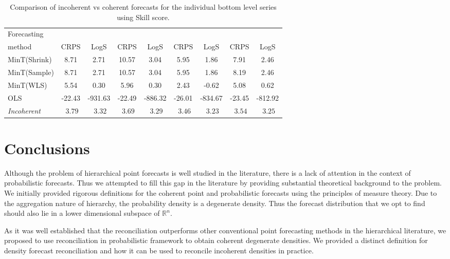 \documentclass[a4paper, 11pt]{article}
\def\mathbi#1{\textit{ #1}}
\begin{document}
\begin{table}
	\caption{Comparison of incoherent vs coherent forecasts for the individual bottom level series using Skill score.}\label{table:5}
	\centering\tabcolsep=0.08cm\small
	\begin{tabular}{@{}lSSSSSSSS@{}}
		\toprule
		Forecasting &
		 &
		 &
		 &
		 \\
		\cmidrule(lr){2-3} \cmidrule(lr){4-5} \cmidrule(lr){6-7} \cmidrule(l){8-9}
		method       & CRPS   & LogS    & CRPS   & LogS    & CRPS   & LogS    & CRPS   & LogS \\
		\midrule
		MinT(Shrink) & 8.71   & 2.71    & 10.57  & 3.04    & 5.95   & 1.86    & 7.91   & 2.46 \\
		MinT(Sample) & 8.71   & 2.71    & 10.57  & 3.04    & 5.95   & 1.86    & 8.19   & 2.46 \\
		MinT(WLS)    & 5.54   & 0.30    & 5.96   & 0.30    & 2.43   & -0.62   & 5.08   & 0.62 \\
		OLS          & -22.43 & -931.63 & -22.49 & -886.32 & -26.01 & -834.67 & -23.45 & -812.92 \\
		\midrule
		\textit{Incoherent} & $\mathbi{3.79}$ & $\mathbi{3.32}$ & $\mathbi{3.69}$ & $\mathbi{3.29}$ & $\mathbi{3.46}$ & $\mathbi{3.23}$ & $\mathbi{3.54}$ & $\mathbi{3.25}$ \\
		\bottomrule
	\end{tabular}
\end{table}

\section{Conclusions}\label{sec:conclusions}

Although the problem of hierarchical point forecasts is well studied in the literature, there is a lack of attention in the context of probabilistic forecasts. Thus we attempted to fill this gap in the literature by providing substantial theoretical background to the problem. We initially provided rigorous definitions for the coherent point and probabilistic forecasts using the principles of measure theory. Due to the aggregation nature of hierarchy, the probability density is a degenerate density. Thus the forecast distribution that we opt to find should also lie in a lower dimensional subspace of $\mathbb{R}^{n}$.

As it was well established that the reconciliation outperforms other conventional point forecasting methods in the hierarchical literature, we proposed to use reconciliation in probabilistic framework to obtain coherent degenerate densities. We provided a distinct definition for density forecast reconciliation and how it can be used to reconcile incoherent densities in practice.
\end{document}
